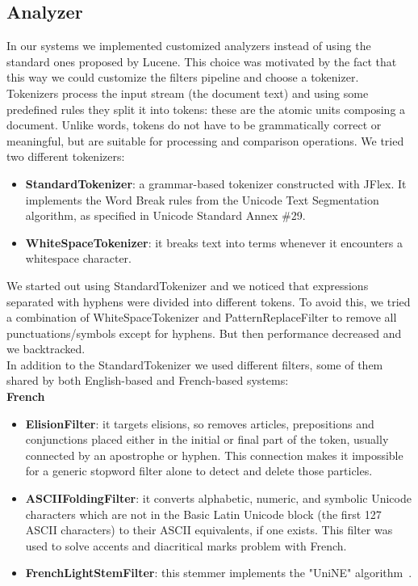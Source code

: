 \subsection{Analyzer}
\label{subsec:analyzer}
In our systems we implemented customized analyzers instead of using the standard ones proposed by Lucene. This choice was motivated by the fact that this way we could customize the filters pipeline and choose a tokenizer. Tokenizers process the input stream (the document text) and using some predefined rules they split it into tokens: these are the atomic units composing a document. Unlike words, tokens do not have to be grammatically correct or meaningful, but are suitable for processing and comparison operations.
We tried two different tokenizers:
\begin{itemize}
    \item \textbf{StandardTokenizer}: a grammar-based tokenizer constructed with JFlex. It implements the Word Break rules from the Unicode Text Segmentation algorithm, as specified in Unicode Standard Annex \#29.
    \item \textbf{WhiteSpaceTokenizer}: it breaks text into terms whenever it encounters a whitespace character.
\end{itemize}
We started out using StandardTokenizer and we noticed that expressions separated with hyphens were divided into different tokens. To avoid this, we tried a combination of WhiteSpaceTokenizer and PatternReplaceFilter to remove all punctuations/symbols except for hyphens. But then performance decreased and we backtracked.
\\
In addition to the StandardTokenizer we used different filters, some of them shared by both English-based and French-based systems:
\\
\textbf{French}
\begin{itemize}
    \item \textbf{ElisionFilter}: it targets elisions, so removes articles, prepositions and conjunctions placed either in the initial or final part of the token, usually connected by an apostrophe or hyphen. This connection makes it impossible for a generic stopword filter alone to detect and delete those particles.
    \item \textbf{ASCIIFoldingFilter}: it converts alphabetic, numeric, and symbolic Unicode characters which are not in the Basic Latin Unicode block (the first 127 ASCII characters) to their ASCII equivalents, if one exists. This filter was used to solve accents and diacritical marks problem with French.
    \item \textbf{FrenchLightStemFilter}: this stemmer implements the "UniNE" algorithm~\cite{frenchlightstemmer}.
\end{itemize}
